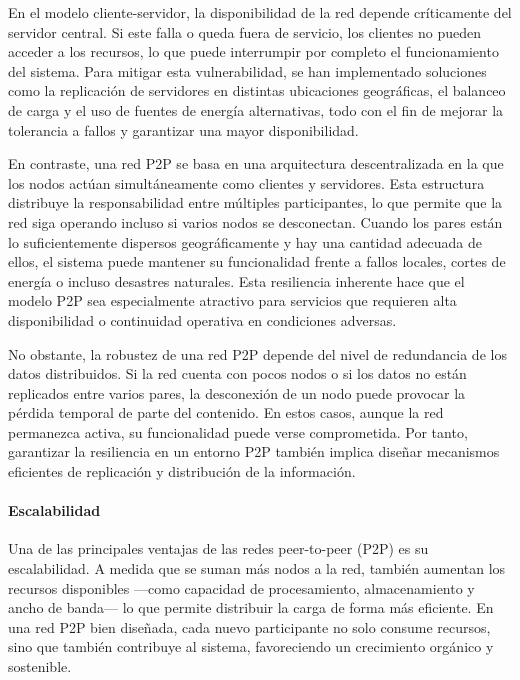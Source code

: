 En el modelo cliente-servidor, la disponibilidad de la red depende críticamente del servidor central. Si este falla o queda fuera de servicio, los clientes no pueden acceder a los recursos, lo que puede interrumpir por completo el funcionamiento del sistema. Para mitigar esta vulnerabilidad, se han implementado soluciones como la replicación de servidores en distintas ubicaciones geográficas, el balanceo de carga \cite{bourke2001server} y el uso de fuentes de energía alternativas, todo con el fin de mejorar la tolerancia a fallos y garantizar una mayor disponibilidad.

En contraste, una red P2P se basa en una arquitectura descentralizada en la que los nodos actúan simultáneamente como clientes y servidores. Esta estructura distribuye la responsabilidad entre múltiples participantes, lo que permite que la red siga operando incluso si varios nodos se desconectan. Cuando los pares están lo suficientemente dispersos geográficamente y hay una cantidad adecuada de ellos, el sistema puede mantener su funcionalidad frente a fallos locales, cortes de energía o incluso desastres naturales. Esta resiliencia inherente hace que el modelo P2P sea especialmente atractivo para servicios que requieren alta disponibilidad o continuidad operativa en condiciones adversas.

No obstante, la robustez de una red P2P depende del nivel de redundancia de los datos distribuidos. Si la red cuenta con pocos nodos o si los datos no están replicados entre varios pares, la desconexión de un nodo puede provocar la pérdida temporal de parte del contenido. En estos casos, aunque la red permanezca activa, su funcionalidad puede verse comprometida. Por tanto, garantizar la resiliencia en un entorno P2P también implica diseñar mecanismos eficientes de replicación y distribución de la información.

\paragraph{Escalabilidad}

Una de las principales ventajas de las redes peer-to-peer (P2P) es su escalabilidad. A medida que se suman más nodos a la red, también aumentan los recursos disponibles —como capacidad de procesamiento, almacenamiento y ancho de banda— lo que permite distribuir la carga de forma más eficiente. En una red P2P bien diseñada, cada nuevo participante no solo consume recursos, sino que también contribuye al sistema, favoreciendo un crecimiento orgánico y sostenible.

